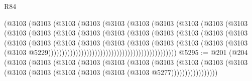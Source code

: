 \begin{lexlean}{R84}
\begin{coremodule}
                                    (@3103
                                      (@3103
                                        (@3103
                                          (@3103
                                            (@3103
                                              (@3103
                                                (@3103
                                                  (@3103
                                                    (@3103
                                                      (@3103
                                                        (@3103
                                                          (@3103
                                                            (@3103
                                                              (@3103
                                                                (@3103
                                                                  (@3103
                                                                    (@3103
                                                                      (@3103
                                                                        (@3103
                                                                          (@3103
                                                                            (@3103
                                                                              (@3103
                                                                                (@3103
                                                                                  (@3103
                                                                                    (@3103
                                                                                      (@3103
                                                                                        (@3103
                                                                                          (@3103
                                                                                            (@3103
                                                                                              (@3103
                                                                                                (@3103
                                                                                                  @5229)))))))))))))))))))))))))))))))))))))))))))))))
@5295 := @201
    (@204
      (@3103
        (@3103
          (@3103
            (@3103
              (@3103
                (@3103
                  (@3103
                    (@3103
                      (@3103 (@3103 (@3103 (@3103 (@3103 (@3103 (@3103 (@3103 @5277)))))))))))))))))

\end{coremodule}
\end{lexlean}

